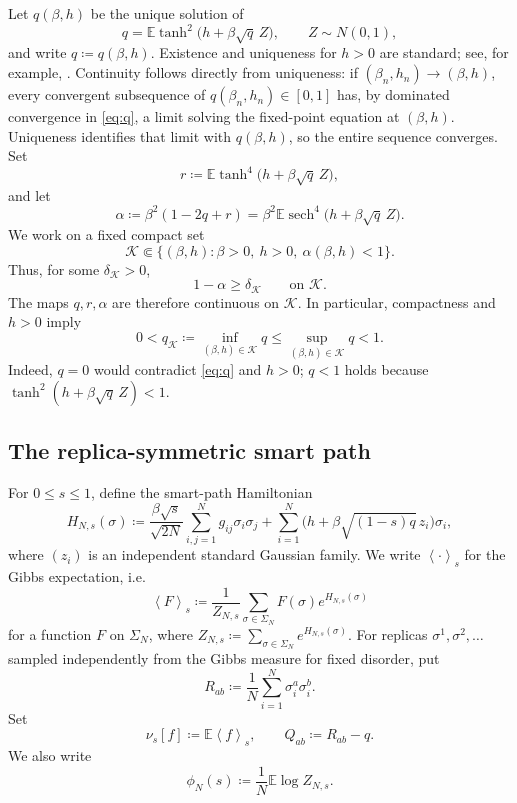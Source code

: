 \documentclass[11pt]{article}
\numberwithin{equation}{section}
\newcommand{\E}{\mathbb{E}}
\newcommand{\1}{\mathbf 1}
\newcommand{\sech}{\operatorname{sech}}
\newcommand{\cK}{\mathcal K}
\newcommand{\braket}[1]{\left\langle #1\right\rangle}
\begin{document}
Let $q(\beta,h)$ be the unique solution of
\begin{equation}
 q=\E\tanh^2\bigl(h+\beta\sqrt q\,Z\bigr),
 \qquad Z\sim N(0,1),
 \label{eq:q}
\end{equation}
and write $q\coloneqq q(\beta,h)$.
Existence and uniqueness for $h>0$ are standard; see, for example,
\cite[Proposition~1.3.8]{Talagrand}.  Continuity follows directly from
uniqueness: if $(\beta_n,h_n)\to(\beta,h)$, every convergent
subsequence of $q(\beta_n,h_n)\in[0,1]$ has, by dominated convergence
in \eqref{eq:q}, a limit solving the fixed-point equation at
$(\beta,h)$.  Uniqueness identifies that limit with $q(\beta,h)$, so
the entire sequence converges.
Set
\begin{equation}
 r\coloneqq\E\tanh^4\bigl(h+\beta\sqrt q\,Z\bigr),
 \label{eq:ra}
\end{equation}
and let
\begin{equation}
 \alpha\coloneqq\beta^2(1-2q+r)
 =\beta^2\E\sech^4\bigl(h+\beta\sqrt q\,Z\bigr).
 \label{eq:alpha}
\end{equation}
We work on a fixed compact set
\begin{equation}
 \cK\Subset\{(\beta,h):\beta>0,\ h>0,\ \alpha(\beta,h)<1\}.
 \label{eq:K}
\end{equation}
Thus, for some $\delta_{\cK}>0$,
\begin{equation}
 1-\alpha\ge\delta_{\cK}
 \qquad\text{on }\cK.
 \label{eq:delta}
\end{equation}
The maps $q,r,\alpha$ are therefore continuous on $\cK$.  In
particular, compactness and $h>0$ imply
\begin{equation}
 0<q_{\cK}\coloneqq\inf_{(\beta,h)\in\cK}q
 \le \sup_{(\beta,h)\in\cK}q<1.
 \label{eq:qcompact}
\end{equation}
Indeed, $q=0$ would contradict \eqref{eq:q} and $h>0$; 
$q<1$ holds because $\tanh^2(h+\beta\sqrt q\,Z)<1$.

\subsection{The replica-symmetric smart path}

For $0\le s\le1$, define the smart-path Hamiltonian
\begin{equation}
 H_{N,s}(\sigma)
 \coloneqq
 \frac{\beta\sqrt s}{\sqrt{2N}}
 \sum_{i,j=1}^Ng_{ij}\sigma_i\sigma_j
 +\sum_{i=1}^N
 \bigl(h+\beta\sqrt{(1-s)q}\,z_i\bigr)\sigma_i,
 \label{eq:path}
\end{equation}
where $(z_i)$ is an independent standard Gaussian family.  We write
$\braket{\cdot}_s$ for the Gibbs expectation, i.e.
\[
\braket{F}_s \coloneqq \frac{1}{Z_{N, s}}\sum _{\sigma \in \Sigma _N} F(\sigma ) e^{H_{N, s}(\sigma)}
\]
for a function $F$ on $\Sigma _N$, where $Z_{N,s} \coloneqq \sum _{\sigma \in \Sigma _N} e^{H_{N,s}(\sigma )}$. For replicas $\sigma^1,\sigma^2,\ldots$ sampled independently from the
Gibbs measure for fixed disorder, put
\[
 R_{ab}\coloneqq\frac1N\sum_{i=1}^N\sigma_i^a\sigma_i^b.
\]
Set
\[
 \nu_s[f]\coloneqq\E\braket{f}_s,\qquad
 Q_{ab}\coloneqq R_{ab}-q.
\]
We also write
\begin{equation}
 \phi_N(s)\coloneqq\frac1N\E\log Z_{N,s}.
 \label{eq:pathfreeenergy}
\end{equation}
\end{document}

